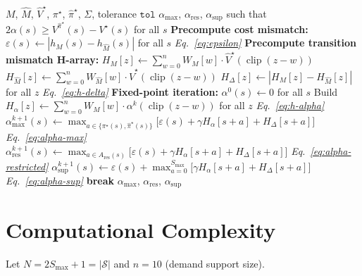 \documentclass[11pt]{article}
\newcommand{\Smax}{S_{\max}}
\newcommand{\clip}{\operatorname{clip}}
\newcommand{\pistar}{\pi^\star}
\newcommand{\pihatstar}{\hat\pi^\star}
\newcommand{\Vstar}{V^\star}
\newcommand{\Vhatstar}{\hat V^\star}
\newcommand{\Vpihat}{V^{\pihatstar}}
\newcommand{\alphares}{\alpha_{\mathrm{res}}}
\begin{document}
\begin{algorithm}[H]
\caption{Sample-Path Dependent AIS Bound}
\label{alg:sample-path}
\begin{algorithmic}[1]
\Require $M$, $\hat M$, $\Vhatstar$, $\pistar$, $\pihatstar$, $\Sigma$, tolerance $\texttt{tol}$
\Ensure $\alpha_{\max}$, $\alphares$, $\alpha_{\sup}$ such that
        $2\alpha(s) \ge \Vpihat(s) - \Vstar(s)$ for all $s$
\Statex
\State \textbf{Precompute cost mismatch:}
  $\varepsilon(s) \gets |h_M(s) - h_{\hat M}(s)|$ for all $s$
  \hfill \textit{Eq.~\eqref{eq:epsilon}}
\Statex
\State \textbf{Precompute transition mismatch H-array:}
\For{$z = -\Smax$ \textbf{to} $2\Smax$}
  \State $H_M[z] \gets \sum_{w=0}^{n} W_M[w] \cdot \Vhatstar(\clip(z-w))$
  \State $H_{\hat M}[z] \gets \sum_{w=0}^{n} W_{\hat M}[w] \cdot \Vhatstar(\clip(z-w))$
\EndFor
\State $H_\Delta[z] \gets |H_M[z] - H_{\hat M}[z]|$ for all $z$
  \hfill \textit{Eq.~\eqref{eq:h-delta}}
\Statex
\State \textbf{Fixed-point iteration:}
\State $\alpha^0(s) \gets 0$ for all $s$
  \State Build $H_\alpha[z] \gets \sum_{w=0}^{n} W_M[w] \cdot \alpha^k(\clip(z-w))$
    for all $z$
    \hfill \textit{Eq.~\eqref{eq:h-alpha}}
    \State $\alpha^{k+1}_{\max}(s) \gets
      \max_{a \in \{\pistar(s),  \pihatstar(s)\}}
      \bigl[\varepsilon(s) + \gamma H_\alpha[s+a] + H_\Delta[s+a]\bigr]$
      \hfill \textit{Eq.~\eqref{eq:alpha-max}}
    \State $\alphares^{k+1}(s) \gets
      \max_{a \in A_{\mathrm{res}}(s)}
      \bigl[\varepsilon(s) + \gamma H_\alpha[s+a] + H_\Delta[s+a]\bigr]$
      \hfill \textit{Eq.~\eqref{eq:alpha-restricted}}
    \State $\alpha^{k+1}_{\sup}(s) \gets
      \varepsilon(s) + \max_{a=0}^{\Smax}
      \bigl[\gamma H_\alpha[s+a] + H_\Delta[s+a]\bigr]$
      \hfill \textit{Eq.~\eqref{eq:alpha-sup}}
  \EndFor
    \State \textbf{break}
  \EndIf
\EndFor
\State \Return $\alpha_{\max}$, $\alphares$, $\alpha_{\sup}$
\end{algorithmic}
\end{algorithm}

\section{Computational Complexity}

Let $N = 2\Smax + 1 = |\mathcal{S}|$ and $n = 10$ (demand support size).
\end{document}
